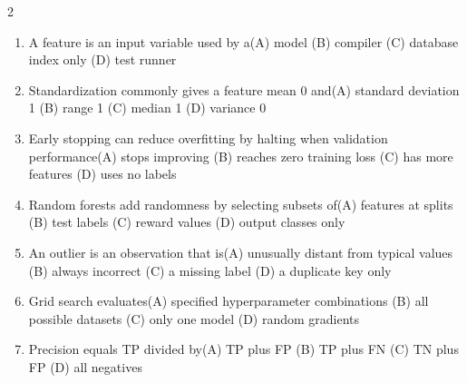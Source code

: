 \documentclass[a4paper]{article}
\begin{document}
\begin{multicols*}{2}
\begin{enumerate}[resume]
\item A feature is an input variable used by a\newline\hspace*{0.6em}(A) model \quad (B) compiler \newline\hspace*{0.6em}(C) database index only \quad (D) test runner
\item Standardization commonly gives a feature mean 0 and\newline\hspace*{0.6em}(A) standard deviation 1 \quad (B) range 1 \newline\hspace*{0.6em}(C) median 1 \quad (D) variance 0
\item Early stopping can reduce overfitting by halting when validation performance\newline\hspace*{0.6em}(A) stops improving \quad (B) reaches zero training loss \newline\hspace*{0.6em}(C) has more features \quad (D) uses no labels
\item Random forests add randomness by selecting subsets of\newline\hspace*{0.6em}(A) features at splits \quad (B) test labels \newline\hspace*{0.6em}(C) reward values \quad (D) output classes only
\item An outlier is an observation that is\newline\hspace*{0.6em}(A) unusually distant from typical values \quad (B) always incorrect \newline\hspace*{0.6em}(C) a missing label \quad (D) a duplicate key only
\item Grid search evaluates\newline\hspace*{0.6em}(A) specified hyperparameter combinations \quad (B) all possible datasets \newline\hspace*{0.6em}(C) only one model \quad (D) random gradients
\item Precision equals TP divided by\newline\hspace*{0.6em}(A) TP plus FP \quad (B) TP plus FN \newline\hspace*{0.6em}(C) TN plus FP \quad (D) all negatives

\end{enumerate}
\end{multicols*}
\end{document}
